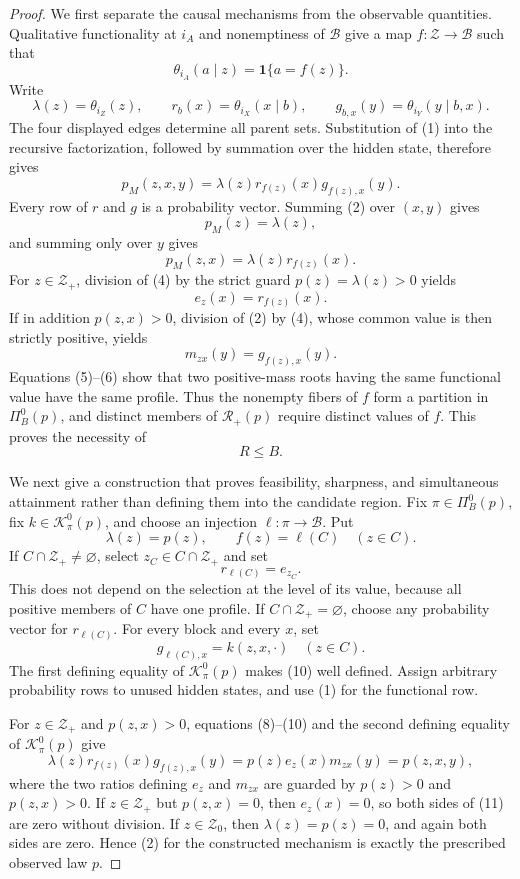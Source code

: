 \documentclass{article}
\begin{document}
\begin{proof}
We first separate the causal mechanisms from the observable quantities.
Qualitative functionality at \(i_A\) and nonemptiness of
\(\mathcal B\) give a map \(f:\mathcal Z\to\mathcal B\) such that
\[
 \theta_{i_A}(a\mid z)=\mathbf 1\{a=f(z)\}.
\tag{1}
\]
Write
\[
 \lambda(z)=\theta_{i_Z}(z),\qquad
 r_b(x)=\theta_{i_X}(x\mid b),\qquad
 g_{b,x}(y)=\theta_{i_Y}(y\mid b,x).
\]
The four displayed edges determine all parent sets.  Substitution of
(1) into the recursive factorization, followed by summation over the
hidden state, therefore gives
\[
 p_M(z,x,y)=\lambda(z)r_{f(z)}(x)g_{f(z),x}(y).
\tag{2}
\]
Every row of \(r\) and \(g\) is a probability vector.  Summing (2) over
\((x,y)\) gives
\[
 p_M(z)=\lambda(z),
\tag{3}
\]
and summing only over \(y\) gives
\[
 p_M(z,x)=\lambda(z)r_{f(z)}(x).
\tag{4}
\]
For \(z\in\mathcal Z_+\), division of (4) by the strict guard
\(p(z)=\lambda(z)>0\) yields
\[
 e_z(x)=r_{f(z)}(x).
\tag{5}
\]
If in addition \(p(z,x)>0\), division of (2) by (4), whose common value
is then strictly positive, yields
\[
 m_{zx}(y)=g_{f(z),x}(y).
\tag{6}
\]
Equations (5)--(6) show that two positive-mass roots having the same
functional value have the same profile.  Thus the nonempty fibers of
\(f\) form a partition in \(\Pi_B^0(p)\), and distinct members of
\(\mathcal R_+(p)\) require distinct values of \(f\).  This proves the
necessity of
\[
 R\leq B.
\tag{7}
\]

We next give a construction that proves feasibility, sharpness, and
simultaneous attainment rather than defining them into the candidate
region.  Fix \(\pi\in\Pi_B^0(p)\), fix
\(k\in\mathcal K_\pi^0(p)\), and choose an injection
\(\ell:\pi\to\mathcal B\).  Put
\[
 \lambda(z)=p(z),\qquad f(z)=\ell(C)\quad(z\in C).
\tag{8}
\]
If \(C\cap\mathcal Z_+\ne\varnothing\), select
\(z_C\in C\cap\mathcal Z_+\) and set
\[
 r_{\ell(C)}=e_{z_C}.
\tag{9}
\]
This does not depend on the selection at the level of its value, because
all positive members of \(C\) have one profile.  If
\(C\cap\mathcal Z_+=\varnothing\), choose any probability vector for
\(r_{\ell(C)}\).  For every block and every \(x\), set
\[
 g_{\ell(C),x}=k(z,x,\cdot)\quad(z\in C).
\tag{10}
\]
The first defining equality of \(\mathcal K_\pi^0(p)\) makes (10)
well defined.  Assign arbitrary probability rows to unused hidden states,
and use (1) for the functional row.

For \(z\in\mathcal Z_+\) and \(p(z,x)>0\), equations (8)--(10) and the
second defining equality of \(\mathcal K_\pi^0(p)\) give
\[
 \lambda(z)r_{f(z)}(x)g_{f(z),x}(y)
 =p(z)e_z(x)m_{zx}(y)=p(z,x,y),
\tag{11}
\]
where the two ratios defining \(e_z\) and \(m_{zx}\) are guarded by
\(p(z)>0\) and \(p(z,x)>0\).  If \(z\in\mathcal Z_+\) but
\(p(z,x)=0\), then \(e_z(x)=0\), so both sides of (11) are zero without
division.  If \(z\in\mathcal Z_0\), then \(\lambda(z)=p(z)=0\), and
again both sides are zero.  Hence (2) for the constructed mechanism is
exactly the prescribed observed law \(p\).


\end{proof}
\end{document}
